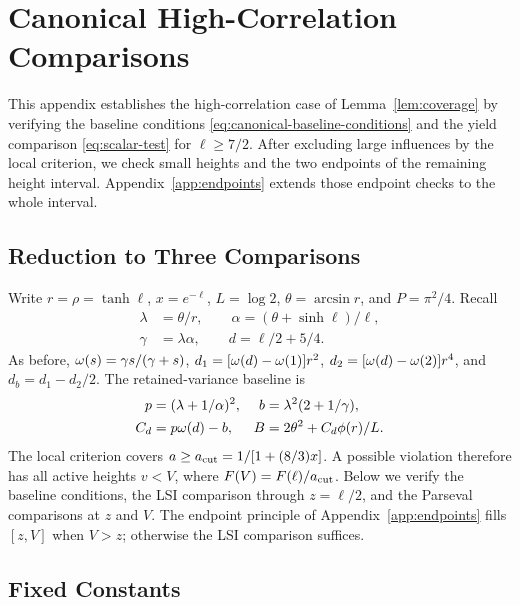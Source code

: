 \section{Canonical High-Correlation Comparisons}
\label{app:verification}\label{app:tail}

This appendix establishes the high-correlation case of
Lemma~\ref{lem:coverage} by verifying the baseline conditions
\eqref{eq:canonical-baseline-conditions} and the yield comparison
\eqref{eq:scalar-test} for \(\ell\ge7/2\).
After excluding large influences by the local criterion, we check small
heights and the two endpoints of the remaining height interval.
Appendix~\ref{app:endpoints} extends those endpoint checks to the
whole interval.

\subsection{Reduction to Three Comparisons}
\label{app:scalar-map}

Write \(r=\rho=\tanh\ell\), \(x=e^{-\ell}\), \(L=\log2\),
\(\theta=\arcsin r\), and \(P=\pi^2/4\). Recall
\begin{equation}
 \begin{split}
 \lambda&=\theta/r,\qquad
 \alpha=(\theta+\sinh\ell)/\ell,\\
 \gamma&=\lambda\alpha,\qquad d=\ell/2+5/4.
 \end{split}
 \label{eq:common-policy}
\end{equation}
As before, \(\omega(s)=\gamma s/(\gamma+s)\),
\(d_1=[\omega(d)-\omega(1)]r^2\),
\(d_2=[\omega(d)-\omega(2)]r^4\), and \(d_b=d_1-d_2/2\).
The retained-variance baseline is
\begin{align*}
 p&=(\lambda+1/\alpha)^2,& b&=\lambda^2(2+1/\gamma),\\
 C_d&=p\omega(d)-b,& B&=2\theta^2+C_d\phi(r)/L.
\end{align*}
The local criterion covers \(a\ge a_{\rm cut}=1/[1+(8/3)x]\).
A possible violation therefore has all active heights \(v<V\), where
\(F(V)=F(\ell)/a_{\rm cut}\).
Below we verify the baseline conditions, the LSI comparison through
\(z=\ell/2\), and the Parseval comparisons at \(z\) and \(V\).
The endpoint principle of
Appendix~\ref{app:endpoints} fills \([z,V]\) when \(V>z\);
otherwise the LSI comparison suffices.




\subsection{Fixed Constants}
\label{app:fixed-arithmetic}

